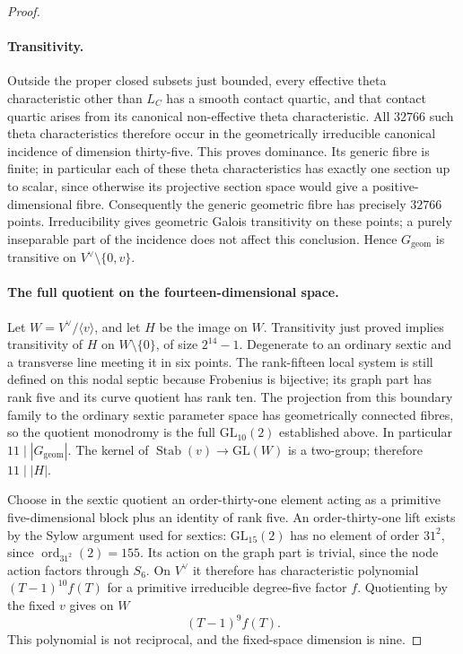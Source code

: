 \begin{proof}
\paragraph{Transitivity.}
Outside the proper closed subsets just bounded, every effective
theta characteristic other than $L_C$ has a smooth contact quartic,
and that contact quartic arises from its canonical non-effective
theta characteristic.  All $32766$ such theta characteristics
therefore occur in the geometrically irreducible canonical incidence
of dimension thirty-five.  This proves dominance.  Its generic
fibre is finite; in particular each of these theta characteristics
has exactly one section up to scalar, since otherwise its projective
section space would give a positive-dimensional fibre.  Consequently
the generic geometric fibre has precisely $32766$ points.
Irreducibility gives geometric Galois transitivity on these points;
a purely inseparable part of the incidence does not affect this
conclusion.  Hence $G_{\mathrm{geom}}$ is transitive on
$V^\vee\setminus\{0,v\}$.

\paragraph{The full quotient on the fourteen-dimensional space.}
Let $W=V^\vee/\langle v\rangle$, and let $H$ be the image on $W$.
Transitivity just proved implies transitivity of $H$ on
$W\setminus\{0\}$, of size $2^{14}-1$.
Degenerate to an ordinary sextic and a transverse line meeting it
in six points.  The rank-fifteen local system is still defined on
this nodal septic because Frobenius is bijective; its graph part
has rank five and its curve quotient has rank ten.  The projection
from this boundary family to the ordinary sextic parameter space
has geometrically connected fibres, so the quotient monodromy is
the full $\mathrm{GL}_{10}(2)$ established above.
In particular $11\mid|G_{\mathrm{geom}}|$.
The kernel of $\operatorname{Stab}(v)\to\mathrm{GL}(W)$ is a
two-group; therefore $11\mid|H|$.

Choose in the sextic quotient an order-thirty-one element acting
as a primitive five-dimensional block plus an identity of rank five.
An order-thirty-one lift exists by the Sylow argument used for
sextics: $\mathrm{GL}_{15}(2)$ has no element of order $31^2$, since
$\operatorname{ord}_{31^2}(2)=155$.
Its action on the graph part is trivial, since the node action
factors through $S_6$.  On $V^\vee$ it therefore has characteristic
polynomial $(T-1)^{10}f(T)$ for a primitive irreducible
degree-five factor $f$.  Quotienting by the fixed $v$ gives on $W$
\[
 (T-1)^9 f(T).
\]
This polynomial is not reciprocal, and the fixed-space dimension
is nine.


\end{proof}
